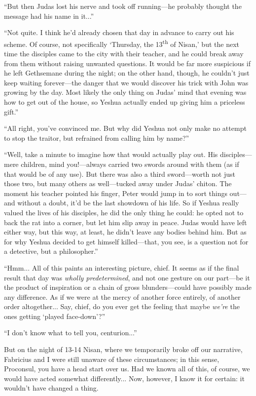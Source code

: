``But then Judas lost his nerve and took off running---he probably thought the message had his name in it...''

``Not quite. I think he'd already chosen that day in advance to carry out his scheme. Of course, not specifically `Thursday, the 13\textsuperscript{th} of Nisan,' but the next time the disciples came to the city with their teacher, and he could break away from them without raising unwanted questions. It would be far more suspicious if he left Gethsemane during the night; on the other hand, though, he couldn't just keep waiting forever---the danger that we would discover his trick with John was growing by the day. Most likely the only thing on Judas' mind that evening was how to get out of the house, so Yeshua actually ended up giving him a priceless gift.''

``All right, you've convinced me. But why did Yeshua not only make no attempt to stop the traitor, but refrained from calling him by name?''

``Well, take a minute to imagine how that would actually play out. His disciples---mere children, mind you!---always carried two swords around with them (as if that would be of any use). But there was also a third sword---worth not just those two, but many others as well---tucked away under Judas' chiton. The moment his teacher pointed his finger, Peter would jump in to sort things out---and without a doubt, it'd be the last showdown of his life. So if Yeshua really valued the lives of his disciples, he did the only thing he could: he opted not to back the rat into a corner, but let him slip away in peace. Judas would have left either way, but this way, at least, he didn't leave any bodies behind him. But as for why Yeshua decided to get himself killed---that, you see, is a question not for a detective, but a philosopher.''

``Hmm... All of this paints an interesting picture, chief. It seems as if the final result that day was \emph{wholly predetermined}, and not one gesture on our part---be it the product of inspiration or a chain of gross blunders---could have possibly made any difference. As if we were at the mercy of another force entirely, of another order altogether... Say, chief, do you ever get the feeling that maybe \emph{we're} the ones getting `played face-down'?''

``I don't know what to tell you, centurion...''

But on the night of 13-14 Nisan, where we temporarily broke off our narrative, Fabricius and I were still unaware of these circumstances; in this sense, Proconsul, you have a head start over us. Had we known all of this, of course, we would have acted somewhat differently... Now, however, I know it for certain: it wouldn't have changed a thing.

